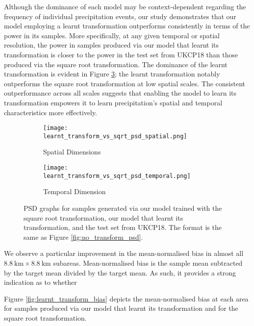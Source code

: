 \documentclass[ oneside,%
                    author={George Herbert},
                    degree={MSci},
                     title={Video Diffusion Models for Climate Simulations},
                  subtitle={}]{dissertation}
\begin{document}
Although the dominance of each model may be context-dependent regarding the frequency of individual precipitation events, our study demonstrates that our model employing a learnt transformation outperforms consistently in terms of the power in its samples. More specifically, at any given temporal or spatial resolution, the power in samples produced via our model that learnt its transformation is closer to the power in the test set from UKCP18 than those produced via the square root transformation. The dominance of the learnt transformation is evident in Figure \ref{fig:learnt_transform_vs_sqrt_psd}; the learnt transformation notably outperforms the square root transformation at low spatial scales. The consistent outperformance across all scales suggests that enabling the model to learn its transformation empowers it to learn precipitation's spatial and temporal characteristics more effectively.

\begin{figure}[htbp]
      \centering
      \begin{subfigure}{.49\textwidth}
            \texttt{[image: learnt\_transform\_vs\_sqrt\_psd\_spatial.png]}
            \caption{Spatial Dimensions}
            \label{fig:learnt_transform_vs_sqrt_psd_spatial}
      \end{subfigure}
      \begin{subfigure}{.49\textwidth}
            \texttt{[image: learnt\_transform\_vs\_sqrt\_psd\_temporal.png]}
            \caption{Temporal Dimension}
            \label{fig:learnt_transform_vs_sqrt_psd_temporal}
      \end{subfigure}
      \caption{PSD graphs for samples generated via our model trained with the square root transformation, our model that learnt its transformation, and the test set from UKCP18. The format is the same as Figure \ref{fig:no_transform_psd}.}
      \label{fig:learnt_transform_vs_sqrt_psd}
\end{figure}



We observe a particular improvement in the mean-normalised bias in almost all $8.8\ \mathrm{km}\times 8.8\ \mathrm{km}$ subareas. Mean-normalised bias is the sample mean subtracted by the target mean divided by the target mean. As such, it provides a strong indication as to whether 


Figure \ref{fig:learnt_transform_bias} depicts the mean-normalised bias at each area for samples produced via our model that learnt its transformation and for the square root transformation. 
\end{document}
